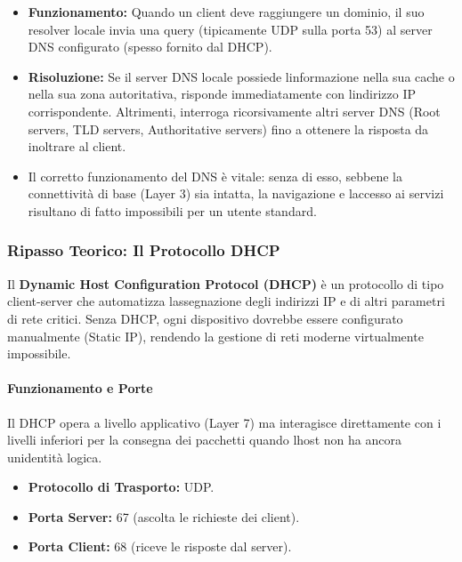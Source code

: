 \documentclass[11pt,a4paper]{article}
\begin{document}
\begin{itemize}
\item
  \textbf{Funzionamento:} Quando un client deve raggiungere un dominio,
  il suo resolver locale invia una query (tipicamente UDP sulla porta
  53) al server DNS configurato (spesso fornito dal DHCP).
\item
  \textbf{Risoluzione:} Se il server DNS locale possiede
  l\textquotesingle informazione nella sua cache o nella sua zona
  autoritativa, risponde immediatamente con l\textquotesingle indirizzo
  IP corrispondente. Altrimenti, interroga ricorsivamente altri server
  DNS (Root servers, TLD servers, Authoritative servers) fino a ottenere
  la risposta da inoltrare al client.
\item
  Il corretto funzionamento del DNS è vitale: senza di esso, sebbene la
  connettività di base (Layer 3) sia intatta, la navigazione e
  l\textquotesingle accesso ai servizi risultano di fatto impossibili
  per un utente standard.
\end{itemize}

\subsubsection{Ripasso Teorico: Il Protocollo
DHCP}\label{ripasso-teorico-il-protocollo-dhcp}

Il \textbf{Dynamic Host Configuration Protocol (DHCP)} è un protocollo
di tipo client-server che automatizza l\textquotesingle assegnazione
degli indirizzi IP e di altri parametri di rete critici. Senza DHCP,
ogni dispositivo dovrebbe essere configurato manualmente (Static IP),
rendendo la gestione di reti moderne virtualmente impossibile.

\paragraph{Funzionamento e Porte}\label{funzionamento-e-porte}

Il DHCP opera a livello applicativo (Layer 7) ma interagisce
direttamente con i livelli inferiori per la consegna dei pacchetti
quando l\textquotesingle host non ha ancora un\textquotesingle identità
logica.

\begin{itemize}
\item
  \textbf{Protocollo di Trasporto:} UDP.
\item
  \textbf{Porta Server:} 67 (ascolta le richieste dei client).
\item
  \textbf{Porta Client:} 68 (riceve le risposte dal server).
\end{itemize}
\end{document}
